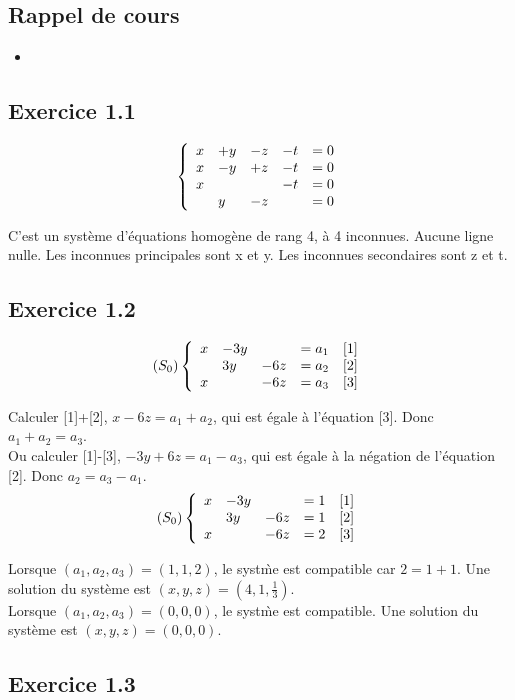 \documentclass[]{book}
\theoremstyle{definition}
\begin{document}
\subsection*{Rappel de cours}

\begin{itemize}
\item 
\end{itemize}


\subsection*{Exercice 1.1}
$$
\left\{ 
\begin{array}{l l l l l}
  x & +y & -z & -t & = 0\\
  x & -y & +z & -t & = 0\\
  x &    &    & -t & = 0\\
    & y  & -z &    & = 0\\
\end{array}
\right. 
$$

C'est un syst\`eme d'\'equations homog\`ene de rang 4, \`a 4 inconnues. Aucune ligne nulle. Les inconnues principales sont x et y. Les inconnues secondaires sont z et t.


\subsection*{Exercice 1.2}
$$(S_0)
\left\{ 
\begin{array}{l l l l l}
  x & -3y &     & = a_1 & [1]\\
    & 3y  & -6z & = a_2 & [2]\\
  x &     & -6z & = a_3 & [3]\\
\end{array}
\right. 
$$

Calculer [1]+[2], $x - 6z = a_1+a_2$, qui est \'egale \`a l'\'equation [3]. Donc $a_1+a_2 = a_3$.\\
Ou calculer [1]-[3], $-3y +6z = a_1-a_3$, qui est \'egale \`a la n\'egation de l'\'equation [2]. Donc $a_2 = a_3-a_1$.\\

$$(S_0)
\left\{ 
\begin{array}{l l l l l}
  x & -3y &     & = 1 & [1]\\
    & 3y  & -6z & = 1 & [2]\\
  x &     & -6z & = 2 & [3]\\
\end{array}
\right. 
$$

Lorsque $(a_1,a_2,a_3) = (1,1,2)$, le syst\`me est compatible car $2 = 1+1$. 
Une solution du syst\`eme est $(x,y,z)=(4,1,\frac{1}{3})$.\\

Lorsque $(a_1,a_2,a_3) = (0,0,0)$, le syst\`me est compatible. Une solution du syst\`eme est $(x,y,z)=(0,0,0)$.\\


\subsection*{Exercice 1.3}
\end{document}
